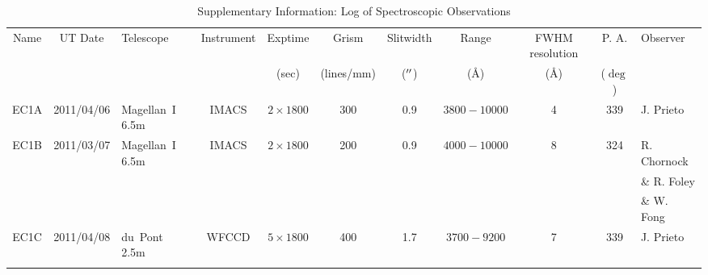 \begin{table}
\footnotesize
\begin{center}
\begin{tabular}{cclcccccccl}
\hline
Name & 
UT Date & 
Telescope & 
Instrument & 
Exptime &
Grism & 
Slitwidth &
Range & 
FWHM resolution & 
P. A. & 
Observer \\
 & 
 & 
 & 
 & 
(sec) &
(lines/mm) & 
($\hbox{$^{\prime\prime}$}$) &
(\AA) & 
(\AA) & 
($\deg$) & 
\\
\hline
EC1A & 2011/04/06    &  Magellan~I 6.5m & IMACS & $2\times 1800$  & 300  & 0.9 & $3800-10000$ & 4 & 339 & J. Prieto\\
EC1B & 2011/03/07    &  Magellan~I 6.5m & IMACS & $2\times 1800$  & 200  & 0.9 & $4000-10000$ & 8 & 324 & R. Chornock\\
&   &   &  &  &   & &  & &  & \& R. Foley\\
&   &   &  &  &   & &  & &  & \& W. Fong\\
EC1C & 2011/04/08    &  du~Pont 2.5m    & WFCCD & $5\times 1800$  & 400  & 1.7 & $3700-9200$  & 7 & 339 & J. Prieto \\
\hline\label{tab:spec}
\end{tabular}
\caption{Supplementary Information: Log of Spectroscopic Observations }
\end{center}
\end{table}



